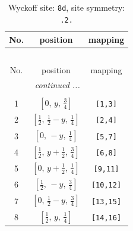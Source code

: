 \documentclass[fleqn,8pt]{jsarticle}
\begin{document}
\begin{longtable}{ccc}
\caption{Wyckoff site: {\tt 8d}, site symmetry: {\tt .2.}}
 \\
 \hline \hline
No. & position & mapping \\ \hline \endfirsthead

\multicolumn{2}{l}{\tablename\ \thetable{}} \\
 \hline \hline
No. & position & mapping \\ \hline \endhead

 \hline \hline
\multicolumn{2}{r}{\footnotesize\it continued ...} \\ \endfoot

 \hline \hline
\multicolumn{2}{r}{} \\ \endlastfoot

1 & $\left[ 0,\, y,\, \frac{3}{4} \right]$ & {\tt [1,3]} \\ \hline
2 & $\left[ \frac{1}{2},\, \frac{1}{2} - y,\, \frac{1}{4} \right]$ & {\tt [2,4]} \\ \hline
3 & $\left[ 0,\, - y,\, \frac{1}{4} \right]$ & {\tt [5,7]} \\ \hline
4 & $\left[ \frac{1}{2},\, y + \frac{1}{2},\, \frac{3}{4} \right]$ & {\tt [6,8]} \\ \hline
5 & $\left[ 0,\, y + \frac{1}{2},\, \frac{1}{4} \right]$ & {\tt [9,11]} \\ \hline
6 & $\left[ \frac{1}{2},\, - y,\, \frac{3}{4} \right]$ & {\tt [10,12]} \\ \hline
7 & $\left[ 0,\, \frac{1}{2} - y,\, \frac{3}{4} \right]$ & {\tt [13,15]} \\ \hline
8 & $\left[ \frac{1}{2},\, y,\, \frac{1}{4} \right]$ & {\tt [14,16]} \\
\end{longtable}
\renewcommand{\arraystretch}{1.2}
\end{document}
